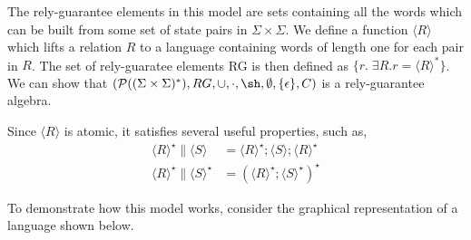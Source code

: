 \documentclass{llncs}
\DeclareMathOperator{\sha}{\sh}
\begin{document}
The rely-guarantee elements in this model are sets containing all the
words which can be built from some set of state pairs in
$\Sigma\times\Sigma$. We define a function $\langle R\rangle$ which
lifts a relation $R$ to a language containing words of length one for
each pair in $R$. The set of rely-guaratee elements RG is then defined
as $\{r.\; \exists R. r = \langle R\rangle^*\}$. We can show that
$(\mathcal{P}((\Sigma\times\Sigma)^*), RG, \cup, \cdot,\sha,
\emptyset, \{\epsilon\}, C)$ is a rely-guarantee algebra.

Since $\langle R\rangle$ is atomic, it satisfies several useful properties, such as,
\begin{align*}
\langle R\rangle^\star \| \langle S\rangle &= \langle R\rangle^\star; \langle S\rangle; \langle R\rangle^\star\\
\langle R\rangle^\star \| \langle S\rangle^\star &= (\langle R\rangle^\star; \langle S\rangle^\star)^\star
\end{align*}

To demonstrate how this model works, consider the graphical
representation of a language shown below.
\end{document}
